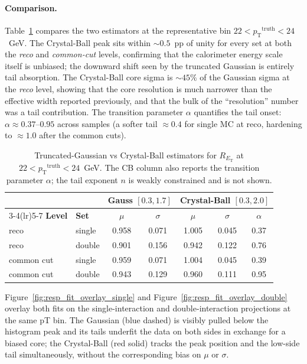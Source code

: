 \documentclass[11pt,letterpaper]{article}
\newcommand{\pT}{\ensuremath{p_{\text{T}}}}
\newcommand{\ET}{\ensuremath{E_{\text{T}}}}
\begin{document}
\paragraph{Comparison.} Table~\ref{tab:resp_cb_vs_gauss} compares the two
estimators at the representative bin $22 < \pT^{\text{truth}} < 24$~GeV.
The Crystal-Ball peak sits within $\sim\!0.5$~pp of unity for every set
at both the \emph{reco} and \emph{common-cut} levels, confirming that
the calorimeter energy scale itself is unbiased; the downward shift seen
by the truncated Gaussian is entirely tail absorption. The
Crystal-Ball core sigma is $\sim\!45\%$ of the Gaussian sigma at the
\emph{reco} level, showing that the core resolution is much narrower than
the effective width reported previously, and that the bulk of the
``resolution'' number was a tail contribution. The transition parameter
$\alpha$ quantifies the tail onset: $\alpha \approx 0.37$--$0.95$ across
samples (a softer tail $\approx 0.4$ for single MC at reco, hardening to
$\approx 1.0$ after the common cuts).

\begin{table}[htbp]
\centering
\caption{Truncated-Gaussian vs Crystal-Ball estimators for $R_{\ET}$ at
  $22 < \pT^{\text{truth}} < 24$~GeV. The CB column also reports the
  transition parameter $\alpha$; the tail exponent $n$ is weakly
  constrained and is not shown.}
\label{tab:resp_cb_vs_gauss}
\begin{tabular}{llcc|ccc}
\toprule
& & \multicolumn{2}{c|}{\textbf{Gauss} $[0.3,1.7]$}
  & \multicolumn{3}{c}{\textbf{Crystal-Ball} $[0.3,2.0]$} \\
\cmidrule(lr){3-4}\cmidrule(lr){5-7}
\textbf{Level} & \textbf{Set} & $\mu$ & $\sigma$ & $\mu$ & $\sigma$ & $\alpha$ \\
\midrule
reco       & single                 & 0.958 & 0.071 & 1.005 & 0.045 & 0.37 \\
reco       & double                 & 0.901 & 0.156 & 0.942 & 0.122 & 0.76 \\
common cut & single                 & 0.959 & 0.071 & 1.004 & 0.045 & 0.39 \\
common cut & double                 & 0.943 & 0.129 & 0.960 & 0.111 & 0.95 \\
\bottomrule
\end{tabular}
\end{table}

Figure~\ref{fig:resp_fit_overlay_single} and
Figure~\ref{fig:resp_fit_overlay_double} overlay both fits on the
single-interaction and double-interaction projections at the same pT bin.
The Gaussian (blue dashed) is visibly pulled below the histogram peak
and its tails underfit the data on both sides in exchange for a biased
core; the Crystal-Ball (red solid) tracks the peak position and the
low-side tail simultaneously, without the corresponding bias on $\mu$
or $\sigma$.
\end{document}
